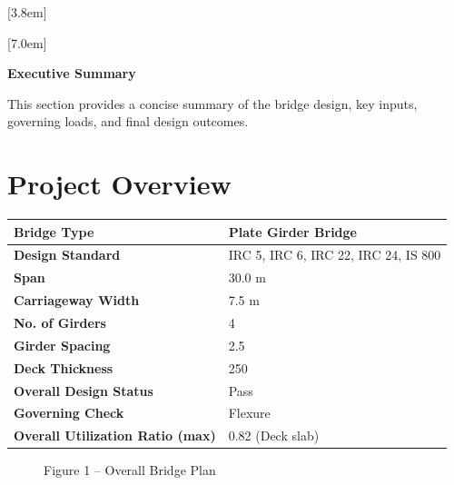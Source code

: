 \documentclass[12pt,a4paper]{report}
\numberwithin{table}{chapter}
\numberwithin{figure}{chapter}
\begin{document}
[3.8em]
  {\normalfont}
  {\contentslabel{2.3em}}
  {\hspace*{-2.3em}}
  {\hfill\contentspage}

[7.0em]
  {\normalfont}
  {\contentslabel{3.2em}}
  {\hspace*{-3.2em}}
  {\hfill\contentspage}

\newpage
\renewcommand{\contentsname}{\centering\Large\bfseries Table of Contents}
\tableofcontents


\newpage
{\centering\Large\bfseries Executive Summary\par}
\vspace{0.8em}

This section provides a concise summary of the bridge design, key inputs, governing loads, and final design outcomes.

\section*{Project Overview}
\label{sec:project-overview}


\begin{tabular}{|L{5.5cm}|L{8.5cm}|}
\hline
\textbf{Bridge Type} & Plate Girder Bridge \\
\hline
\textbf{Design Standard} & IRC 5, IRC 6, IRC 22, IRC 24, IS 800 \\
\hline
\textbf{Span} & 30.0 m \\
\hline
\textbf{Carriageway Width} & 7.5 m \\
\hline
\textbf{No. of Girders} & 4 \\
\hline
\textbf{Girder Spacing} & 2.5 \\
\hline
\textbf{Deck Thickness} & 250 \\
\hline
\textbf{Overall Design Status} & Pass \\
\hline
\textbf{Governing Check} & Flexure \\
\hline
\textbf{Overall Utilization Ratio (max)} & 0.82 (Deck slab) \\
\hline
\end{tabular}


\begin{figure}[H]
\centering
{}
\caption*{Figure 1 -- Overall Bridge Plan}
\end{figure}
\end{document}
